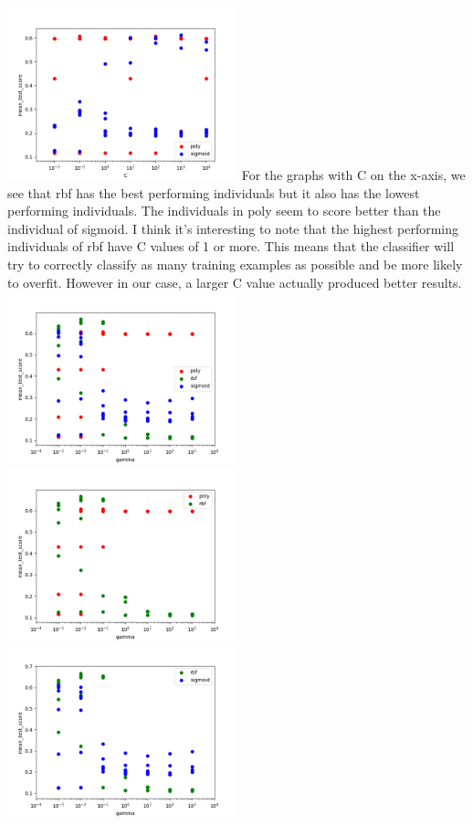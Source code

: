 \documentclass[12pt]{article}
\begin{document}
\includegraphics[width=0.5\textwidth]{SVM_C3.png}
For the graphs with C on the x-axis, we see that rbf has the best performing individuals but it also has the lowest performing individuals. The individuals in poly seem to score better than the individual of sigmoid. I think it's interesting to note that the highest performing individuals of rbf have C values of 1 or more. This means that the classifier will try to correctly classify as many training examples as possible and be more likely to overfit. However in our case, a larger C value actually produced better results.
\includegraphics[width=0.5\textwidth]{SVM_gamma0.png}
\includegraphics[width=0.5\textwidth]{SVM_gamma1.png}
\includegraphics[width=0.5\textwidth]{SVM_gamma2.png}
\end{document}
